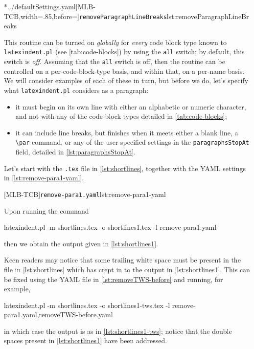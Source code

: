 	\cmhlistingsfromfile[style=removeParagraphLineBreaks]*{../defaultSettings.yaml}[MLB-TCB,width=.85\linewidth,before=\centering]{\texttt{removeParagraphLineBreaks}}{lst:removeParagraphLineBreaks}

	This routine can be turned on \emph{globally} for \emph{every}
	code block type known to \texttt{latexindent.pl}
	(see \vref{tab:code-blocks}) by using the
	\texttt{all} switch; by default, this switch is
	\emph{off}. Assuming that the \texttt{all} switch is off,
	then the routine can be controlled on a per-code-block-type basis, and within that, on a
	per-name basis. We will consider examples of each of these in turn, but before we do,
	let's specify what \texttt{latexindent.pl} considers as a paragraph:
	\begin{itemize}
		\item it must begin on its own line with either an alphabetic or numeric character, and not
		      with any of the code-block types detailed in \vref{tab:code-blocks};
		\item it can include line breaks, but finishes when it meets either a blank line, a
		      \lstinline!\par! command, or any of the user-specified settings in the
		      \texttt{paragraphsStopAt} field, detailed in \vref{lst:paragraphsStopAt}.
	\end{itemize}

	Let's start with the \texttt{.tex} file in \cref{lst:shortlines},
	together with the YAML settings in \cref{lst:remove-para1-yaml}.

	\begin{cmhtcbraster}
		[MLB-TCB]{\texttt{remove-para1.yaml}}{lst:remove-para1-yaml}
	\end{cmhtcbraster}

	Upon running the command
	\begin{commandshell}
latexindent.pl -m shortlines.tex -o shortlines1.tex -l remove-para1.yaml
\end{commandshell}
	then we obtain the output given in \cref{lst:shortlines1}.


	Keen readers may notice that some trailing white space must be present in the file in
	\cref{lst:shortlines} which has crept in to the output in
	\cref{lst:shortlines1}. This can be fixed using the YAML file in
	\vref{lst:removeTWS-before} and running, for example,
	\begin{commandshell}
latexindent.pl -m shortlines.tex -o shortlines1-tws.tex -l remove-para1.yaml,removeTWS-before.yaml  
\end{commandshell}
	in which case the output is as in \cref{lst:shortlines1-tws}; notice that the double
	spaces present in \cref{lst:shortlines1} have been addressed.

